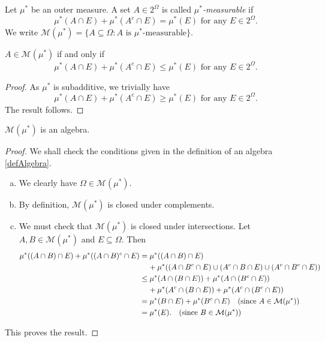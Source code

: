 \begin{definition}
    Let $\mu^*$ be an outer measure. A set $A\in 2^\Omega$ is called \textit{$\mu^*$-measurable} if
    $$\mu^*(A\cap E) + \mu^*(A^c\cap E) = \mu^*(E)\text{ for any }E\in 2^\Omega.$$
    We write $\mathcal{M}(\mu^*)=\{A\subseteq\Omega:A\text{ is }\mu^*\text{-measurable}\}.$
\end{definition}

\begin{lemma}
\label{mu measurable iff leq}
    $A\in\mathcal{M}(\mu^*)$ if and only if
    $$\mu^*(A\cap E) + \mu^*(A^c\cap E) \leq \mu^*(E)\text{ for any }E\in 2^\Omega.$$
\end{lemma}
\begin{proof}
    As $\mu^*$ is subadditive, we trivially have
    $$\mu^*(A\cap E) + \mu^*(A^c\cap E) \geq \mu^*(E)\text{ for any }E\in 2^\Omega.$$
    The result follows.
\end{proof}

\begin{lemma}
    $\mathcal{M}(\mu^*)$ is an algebra.
\end{lemma}
\begin{proof}
    We shall check the conditions given in the definition of an algebra \cref{defAlgebra}.
    \begin{enumerate}[(a)]
        \item We clearly have $\Omega\in\mathcal{M}(\mu^*)$.
        \item By definition, $\mathcal{M}(\mu^*)$ is closed under complements.
        \item We must check that $\mathcal{M}(\mu^*)$ is closed under intersections. Let $A,B\in\mathcal{M}(\mu^*)$ and $E\subseteq\Omega$. Then
        \begin{align*}
            \mu^*((A\cap B)\cap E)+\mu^*((A\cap B)^c\cap E) &= \mu^*((A\cap B)\cap E) \\ &\hspace{4mm}+\mu^*((A\cap B^c\cap E)\cup(A^c\cap B\cap E)\cup(A^c\cap B^c\cap E)) \\
            &\leq \mu^*(A\cap (B\cap E))+\mu^*(A\cap (B^c\cap E))\\ &\hspace{4mm}+\mu^*(A^c\cap (B\cap E)) + \mu^*(A^c\cap (B^c\cap E)) \\
            &= \mu^*(B\cap E) + \mu^*(B^c\cap E)\quad\text{(since $A\in\mathcal{M}(\mu^*)$)} \\
            &= \mu^*(E). \quad\text{(since $B\in\mathcal{M}(\mu^*)$)}
        \end{align*}
    \end{enumerate}
    This proves the result.
\end{proof}

